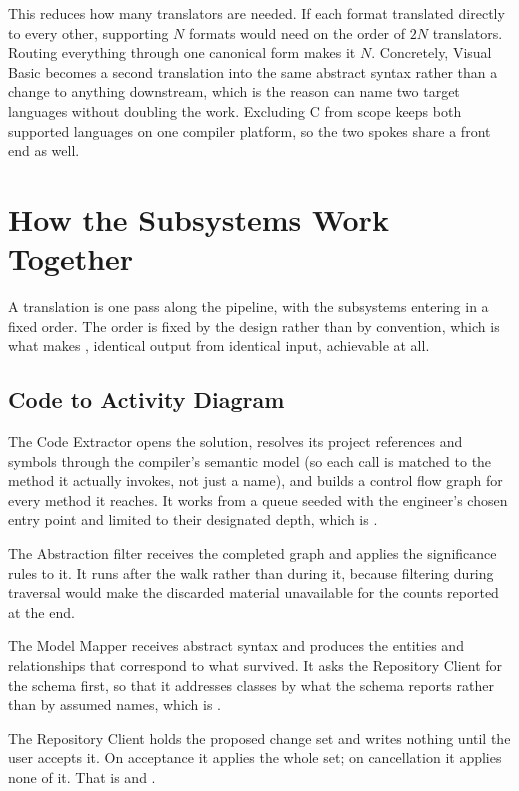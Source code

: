 This reduces how many translators are needed. If each format translated
directly to every other, supporting $N$ formats would need on the order of
$2N$ translators. Routing
everything through one canonical form makes it $N$. Concretely, Visual Basic
becomes a second translation into the same abstract syntax rather than a change
to anything downstream, which is the reason  can name two target
languages without doubling the work. Excluding C from scope keeps both supported
languages on one compiler platform, so the two spokes share a front end as well.

\section{How the Subsystems Work Together}

A translation is one pass along the pipeline, with the subsystems entering in a
fixed order. The order is fixed by the design rather than by convention, which
is what makes , identical output from identical input, achievable at
all.

\subsection{Code to Activity Diagram}

The Code Extractor opens the solution, resolves its project references and symbols through the compiler's semantic model (so each call is matched to the method it actually invokes, not just a name), and builds a control flow graph for every method it reaches. It works from a queue seeded with the engineer's chosen entry point and limited to their designated depth, which is
.

The Abstraction filter receives the completed graph and applies the significance
rules to it. It runs after the walk rather than during it, because filtering
during traversal would make the discarded material unavailable for the counts
reported at the end.

The Model Mapper receives abstract syntax and produces the entities and
relationships that correspond to what survived. It asks the Repository Client
for the schema first, so that it addresses classes by what the schema reports
rather than by assumed names, which is .

The Repository Client holds the proposed change set and writes nothing until the
user accepts it. On acceptance it applies the whole set; on cancellation it
applies none of it. That is  and .

